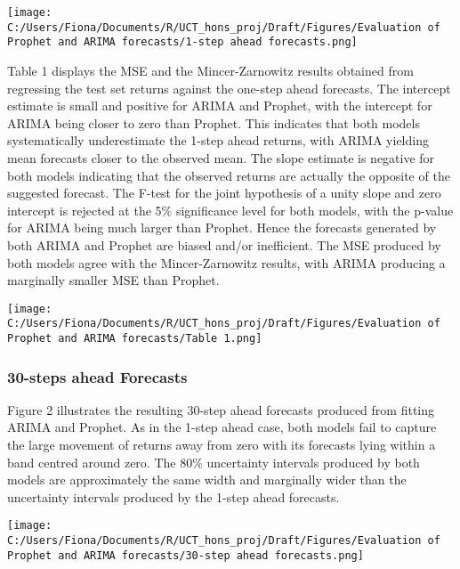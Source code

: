 \documentclass[12pt,a4paper]{article}
\numberwithin{equation}{section}
\numberwithin{figure}{section}
\numberwithin{table}{section}
\let\origfigure\figure
\let\endorigfigure\endfigure
\renewenvironment{figure}[1][2] {
    \expandafter\origfigure\expandafter[H]
} {
    \endorigfigure
}
\begin{document}
\begin{figure}[htbp]
\centering
\texttt{[image: C:/Users/Fiona/Documents/R/UCT\_hons\_proj/Draft/Figures/Evaluation of Prophet and ARIMA forecasts/1-step ahead forecasts.png]}
\caption{1-step ahead forecasts from the ARIMA(1,0,0) and Prophet model}
\end{figure}

Table 1 displays the MSE and the Mincer-Zarnowitz results obtained from
regressing the test set returns against the one-step ahead forecasts.
The intercept estimate is small and positive for ARIMA and Prophet, with
the intercept for ARIMA being closer to zero than Prophet. This
indicates that both models systematically underestimate the 1-step ahead
returns, with ARIMA yielding mean forecasts closer to the observed mean.
The slope estimate is negative for both models indicating that the
observed returns are actually the opposite of the suggested forecast.
The F-test for the joint hypothesis of a unity slope and zero intercept
is rejected at the 5\% significance level for both models, with the
p-value for ARIMA being much larger than Prophet. Hence the forecasts
generated by both ARIMA and Prophet are biased and/or inefficient. The
MSE produced by both models agree with the Mincer-Zarnowitz results,
with ARIMA producing a marginally smaller MSE than Prophet.

\begin{figure}[htbp]
\centering
\texttt{[image: C:/Users/Fiona/Documents/R/UCT\_hons\_proj/Draft/Figures/Evaluation of Prophet and ARIMA forecasts/Table 1.png]}
\caption{Mincer-Zarnowitz results for 1-step ahead forecasts}
\end{figure}

\subsubsection{30-steps ahead Forecasts}\label{steps-ahead-forecasts}

Figure 2 illustrates the resulting 30-step ahead forecasts produced from
fitting ARIMA and Prophet. As in the 1-step ahead case, both models fail
to capture the large movement of returns away from zero with its
forecasts lying within a band centred around zero. The 80\% uncertainty
intervals produced by both models are approximately the same width and
marginally wider than the uncertainty intervals produced by the 1-step
ahead forecasts.

\begin{figure}[htbp]
\centering
\texttt{[image: C:/Users/Fiona/Documents/R/UCT\_hons\_proj/Draft/Figures/Evaluation of Prophet and ARIMA forecasts/30-step ahead forecasts.png]}
\caption{30-step ahead forecasts from the ARIMA(1,0,0) and Prophet
model}
\end{figure}
\end{document}
